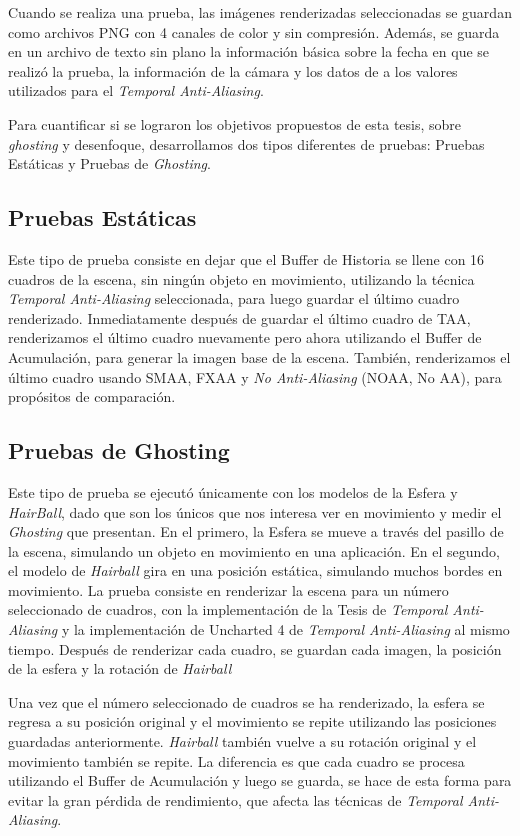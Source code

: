 \documentclass[pregrado]{tesis-usb} %
\begin{document}
Cuando se realiza una prueba, las imágenes renderizadas seleccionadas se guardan como  archivos PNG con 4 canales de color y sin compresión. Además, se guarda en un archivo de texto sin plano la información básica sobre la fecha en que se realizó la prueba, la información de la cámara y los datos de a los valores utilizados para el \textit{Temporal Anti-Aliasing}.

Para cuantificar si se lograron los objetivos propuestos de esta tesis, sobre \textit{ghosting} y desenfoque, desarrollamos dos tipos diferentes de pruebas: Pruebas Estáticas y Pruebas de \textit{Ghosting}.

\subsection{Pruebas Estáticas}
Este tipo de prueba consiste en dejar que el Buffer de Historia se llene con 16 cuadros de la escena, sin ningún objeto en movimiento, utilizando la técnica \textit{Temporal Anti-Aliasing} seleccionada, para luego guardar el último cuadro renderizado. Inmediatamente después de guardar el último cuadro de TAA, renderizamos el último cuadro nuevamente pero ahora utilizando el Buffer de Acumulación, para generar la imagen base de la escena. También, renderizamos el último cuadro usando SMAA, FXAA y \textit{No Anti-Aliasing} (NOAA, No AA), para propósitos de comparación.

\subsection{Pruebas de Ghosting}
Este tipo de prueba  se ejecutó únicamente con los modelos de la Esfera y \textit{HairBall}, dado que son los únicos que nos interesa ver en movimiento y medir el \textit{Ghosting} que presentan. En el primero, la Esfera se mueve a través del pasillo de la escena, simulando un objeto en movimiento en una aplicación. En el segundo, el modelo de \textit{Hairball} gira en una posición estática, simulando muchos bordes en movimiento. La prueba consiste en renderizar la escena para un número seleccionado de cuadros, con la implementación de la Tesis de \textit{Temporal Anti-Aliasing} y la implementación de Uncharted 4 de \textit{Temporal Anti-Aliasing} al mismo tiempo. Después de renderizar cada cuadro, se guardan cada imagen, la posición de la esfera y la rotación de \textit{Hairball}

Una vez que el número seleccionado de cuadros se ha renderizado, la esfera se regresa a su posición original y el movimiento se repite utilizando las posiciones guardadas anteriormente. \textit{Hairball} también vuelve a su rotación original y el movimiento también se repite. La diferencia es que cada cuadro se procesa utilizando el Buffer de Acumulación y luego se guarda, se hace de esta forma para evitar la gran pérdida de rendimiento, que afecta las técnicas de \textit{Temporal Anti-Aliasing}.
\end{document}
